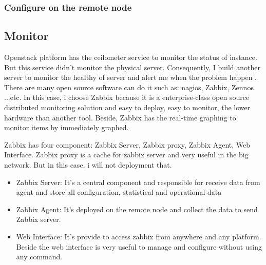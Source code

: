 	\subsubsection{Configure on the remote node}

	


\subsection{Monitor}
Openstack platform has the ceilometer service to monitor the status of instance. But this service didn't monitor the physical server. Consequently, I build another server to monitor the healthy of server and alert me when the problem happen . There are many open source software can do it such as: nagios, Zabbix, Zennos ...etc. In this case, i choose Zabbix because it is a enterprise-class open source distributed monitoring solution and  easy to deploy, easy to monitor, the lower hardware than another tool. Beside, Zabbix has the real-time graphing to monitor items by immediately graphed. 

Zabbix has four component: Zabbix Server, Zabbix proxy, Zabbix Agent, Web Interface. Zabbix proxy is a cache for zabbix server and very useful in the big network. But in this case, i will not deployment that.

\begin{itemize}
  \item Zabbix Server: It's a central component and responsible for receive data from agent and store all configuration, statistical and operational data

  \item Zabbix Agent: It's deployed on the remote node and collect the data to send Zabbix server.
	\item Web Interface: It's provide to access zabbix from anywhere and any platform. Beside the web interface is very useful to manage and configure without using any command.
\end{itemize}